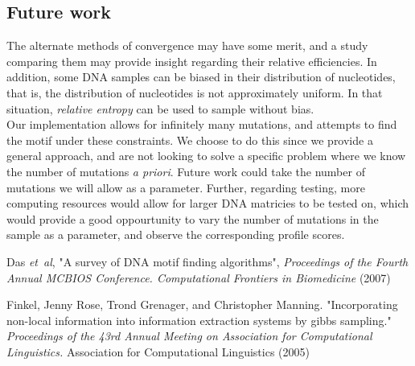 \documentclass{bioinfo}
\begin{document}
\subsection{Future work}
The alternate methods of convergence may have some merit, and a study comparing them may provide insight regarding their relative efficiencies. In addition, some DNA samples can be biased in their distribution of nucleotides, that is, the distribution of nucleotides is not approximately uniform. In that situation, \textit{relative entropy} can be used to sample without bias. \\
Our implementation allows for infinitely many mutations, and attempts to find the motif under these constraints. We choose to do this since we provide a general approach, and are not looking to solve a specific problem where we know the number of mutations \textit{a priori}. Future work could take the number of mutations we will allow as a parameter. Further, regarding testing, more computing resources would allow for larger DNA matricies to be tested on, which would provide a good oppourtunity to vary the number of mutations in the sample as a parameter, and observe the corresponding profile scores.

%
%
%
%

%
%
%
%

\begin{thebibliography}{}
    Das \textit{et~al}, "A survey of DNA motif finding algorithms", \textit{Proceedings of the Fourth Annual MCBIOS Conference. Computational Frontiers in Biomedicine} (2007)

    Finkel, Jenny Rose, Trond Grenager, and Christopher Manning. "Incorporating non-local information into information extraction systems by gibbs sampling." \textit{Proceedings of the 43rd Annual Meeting on Association for Computational Linguistics.} Association for Computational Linguistics (2005)
\end{thebibliography}
\end{document}
